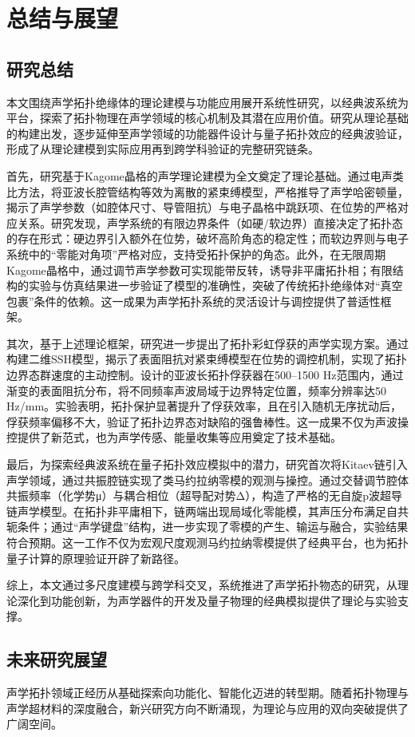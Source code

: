 \chapter{总结与展望}
\section{研究总结}
本文围绕声学拓扑绝缘体的理论建模与功能应用展开系统性研究，以经典波系统为平台，探索了拓扑物理在声学领域的核心机制及其潜在应用价值。研究从理论基础的构建出发，逐步延伸至声学领域的功能器件设计与量子拓扑效应的经典波验证，形成了从理论建模到实际应用再到跨学科验证的完整研究链条。

首先，研究基于Kagome晶格的声学理论建模为全文奠定了理论基础。通过电声类比方法，将亚波长腔管结构等效为离散的紧束缚模型，严格推导了声学哈密顿量，揭示了声学参数（如腔体尺寸、导管阻抗）与电子晶格中跳跃项、在位势的严格对应关系。研究发现，声学系统的有限边界条件（如硬/软边界）直接决定了拓扑态的存在形式：硬边界引入额外在位势，破坏高阶角态的稳定性；而软边界则与电子系统中的“零能对角项”严格对应，支持受拓扑保护的角态。此外，在无限周期Kagome晶格中，通过调节声学参数可实现能带反转，诱导非平庸拓扑相；有限结构的实验与仿真结果进一步验证了模型的准确性，突破了传统拓扑绝缘体对“真空包裹”条件的依赖。这一成果为声学拓扑系统的灵活设计与调控提供了普适性框架。

其次，基于上述理论框架，研究进一步提出了拓扑彩虹俘获的声学实现方案。通过构建二维SSH模型，揭示了表面阻抗对紧束缚模型在位势的调控机制，实现了拓扑边界态群速度的主动控制。设计的亚波长拓扑俘获器在500–1500 Hz范围内，通过渐变的表面阻抗分布，将不同频率声波局域于边界特定位置，频率分辨率达50 Hz/mm。实验表明，拓扑保护显著提升了俘获效率，且在引入随机无序扰动后，俘获频率偏移不大，验证了拓扑边界态对缺陷的强鲁棒性。这一成果不仅为声波操控提供了新范式，也为声学传感、能量收集等应用奠定了技术基础。

最后，为探索经典波系统在量子拓扑效应模拟中的潜力，研究首次将Kitaev链引入声学领域，通过共振腔链实现了类马约拉纳零模的观测与操控。通过交替调节腔体共振频率（化学势μ）与耦合相位（超导配对势Δ），构造了严格的无自旋p波超导链声学模型。在拓扑非平庸相下，链两端出现局域化零能模，其声压分布满足自共轭条件；通过“声学键盘”结构，进一步实现了零模的产生、输运与融合，实验结果符合预期。这一工作不仅为宏观尺度观测马约拉纳零模提供了经典平台，也为拓扑量子计算的原理验证开辟了新路径。

综上，本文通过多尺度建模与跨学科交叉，系统推进了声学拓扑物态的研究，从理论深化到功能创新，为声学器件的开发及量子物理的经典模拟提供了理论与实验支撑。

\section{未来研究展望}
声学拓扑领域正经历从基础探索向功能化、智能化迈进的转型期。随着拓扑物理与声学超材料的深度融合，新兴研究方向不断涌现，为理论与应用的双向突破提供了广阔空间。

